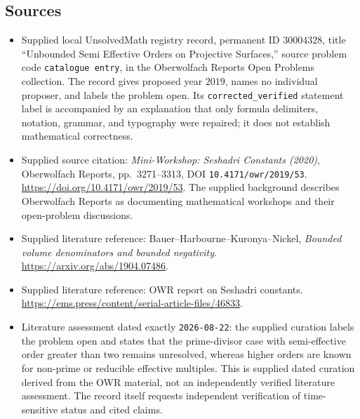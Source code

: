 \documentclass[11pt]{article}
\begin{document}
\subsection{Sources}
\begin{itemize}
\item Supplied local UnsolvedMath registry record, permanent ID \(30004328\), title ``Unbounded Semi Effective Orders on Projective Surfaces,'' source problem code \texttt{catalogue entry}, in the Oberwolfach Reports Open Problems collection. The record gives proposed year \(2019\), names no individual proposer, and labels the problem open. Its \texttt{corrected\_verified} statement label is accompanied by an explanation that only formula delimiters, notation, grammar, and typography were repaired; it does not establish mathematical correctness.
\item Supplied source citation: \emph{Mini-Workshop: Seshadri Constants (2020)}, Oberwolfach Reports, pp.\ 3271--3313, DOI \texttt{10.4171/owr/2019/53}. \url{https://doi.org/10.4171/owr/2019/53}. The supplied background describes Oberwolfach Reports as documenting mathematical workshops and their open-problem discussions.
\item Supplied literature reference: Bauer--Harbourne--Kuronya--Nickel, \emph{Bounded volume denominators and bounded negativity}. \url{https://arxiv.org/abs/1904.07486}.
\item Supplied literature reference: OWR report on Seshadri constants. \url{https://ems.press/content/serial-article-files/46833}.
\item Literature assessment dated exactly \texttt{2026-08-22}: the supplied curation labels the problem open and states that the prime-divisor case with semi-effective order greater than two remains unresolved, whereas higher orders are known for non-prime or reducible effective multiples. This is supplied dated curation derived from the OWR material, not an independently verified literature assessment. The record itself requests independent verification of time-sensitive status and cited claims.
\end{itemize}
\end{document}
